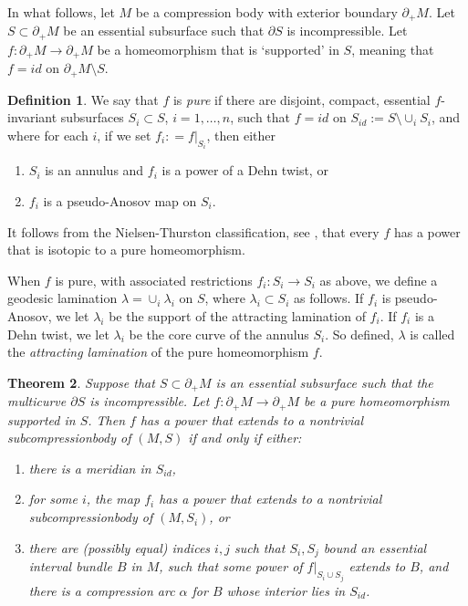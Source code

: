 \documentclass[12pt]{amsart}
\newtheorem{theorem}{Theorem}[section] \newtheorem{philosophy}{Statement}[theorem]
\theoremstyle{definition}
\newtheorem{definition}[theorem]{Definition}
\theoremstyle{remark}
\begin{document}
In what follows, let $M $ be a compression body with exterior boundary $\partial_+M$. Let $S\subset \partial_+M$ be an essential subsurface such that $\partial S$ is incompressible. Let $f: \partial_+ M \longrightarrow \partial_+ M$ be a homeomorphism that is `supported' in $S$, meaning that $f=id$ on $\partial_+ M\setminus S$.

\begin{definition}
We say that $f$ is \emph{pure} if there are disjoint, compact, essential $f$-invariant subsurfaces $S_i \subset S$, $i=1,\ldots, n$, such that $f=id$ on $S_{id}:=S \setminus \cup_i S_i$, and where for each $i$, if we set  $f_i: = f | _{S_i}$, then either
\begin {enumerate}
\item $S_i $ is an annulus and $f_i $ is a power of a Dehn twist, or
\item $f_i $ is a pseudo-Anosov map on $S_i$.
\end {enumerate}
\end{definition}
It follows from the Nielsen-Thurston classification, see \cite{Farbprimer}, that every $f$ has a power that is isotopic to a pure homeomorphism.

\medskip

When $f$ is pure, with associated restrictions $f_i : S_i \longrightarrow S_i$ as above, we define a geodesic lamination $\lambda=\cup_i\lambda_i$ on $S$, where $\lambda_i \subset S_i$ as follows. If $f_i$ is pseudo-Anosov, we let $\lambda_i$ be the support of the attracting lamination of $f_i$. If $f_i$ is a Dehn twist, we let $\lambda_i$ be the core curve of the annulus $S_i$. So defined, $\lambda$ is called the \emph{attracting lamination} of the pure homeomorphism $f$.






\begin{theorem}\label{extension}
Suppose that $S \subset \partial_+ M$ is  an essential subsurface such that the multicurve $\partial S$ is incompressible. Let $f : \partial_+ M \longrightarrow \partial_+ M$ be a pure homeomorphism supported in $S$. Then $f$ has a power that extends to a nontrivial subcompressionbody of $(M,S)$ if and only if either: 
	\begin{enumerate}
		\item there is a meridian in $S_{id}$, 
		\item for some $i$, the map $f_i$ has a power that extends to a nontrivial subcompressionbody of $(M,S_i)$, or
		\item there are (possibly equal) indices $i,j$ such that $S_i,S_j$ bound an essential interval bundle $B$ in $M$, such that some power of $f|_{S_i \cup S_j}$ extends to $B$, and  there is a compression arc $\alpha$ for $B$ whose interior lies in $S_{id}$. \end{enumerate}
\end{theorem}
\end{document}
